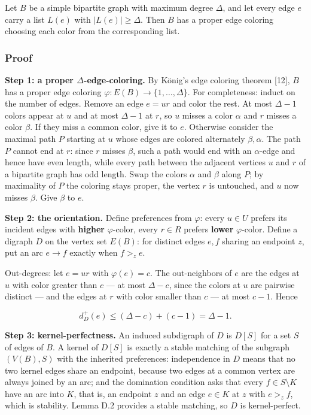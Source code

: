 \documentclass[
  11pt,
]{article}
\begin{document}
Let \(B\) be a simple bipartite graph with maximum degree \(\Delta\), and let every edge \(e\) carry a list \(L(e)\) with \(|L(e)|\ge\Delta\). Then \(B\) has a proper edge coloring choosing each color from the corresponding list.

\subsubsection{Proof}\label{proof-9}

\textbf{Step 1: a proper \(\Delta\)-edge-coloring.} By König's edge coloring theorem {[}12{]}, \(B\) has a proper edge coloring \(\varphi:E(B)\to\{1,\ldots,\Delta\}\). For completeness: induct on the number of edges. Remove an edge \(e=ur\) and color the rest. At most \(\Delta-1\) colors appear at \(u\) and at most \(\Delta-1\) at \(r\), so \(u\) misses a color \(\alpha\) and \(r\) misses a color \(\beta\). If they miss a common color, give it to \(e\). Otherwise consider the maximal path \(P\) starting at \(u\) whose edges are colored alternately \(\beta,\alpha\). The path \(P\) cannot end at \(r\): since \(r\) misses \(\beta\), such a path would end with an \(\alpha\)-edge and hence have even length, while every path between the adjacent vertices \(u\) and \(r\) of a bipartite graph has odd length. Swap the colors \(\alpha\) and \(\beta\) along \(P\); by maximality of \(P\) the coloring stays proper, the vertex \(r\) is untouched, and \(u\) now misses \(\beta\). Give \(\beta\) to \(e\).

\textbf{Step 2: the orientation.} Define preferences from \(\varphi\): every \(u\in U\) prefers its incident edges with \textbf{higher} \(\varphi\)-color, every \(r\in R\) prefers \textbf{lower} \(\varphi\)-color. Define a digraph \(D\) on the vertex set \(E(B)\): for distinct edges \(e,f\) sharing an endpoint \(z\), put an arc \(e\to f\) exactly when \(f>_ze\).

Out-degrees: let \(e=ur\) with \(\varphi(e)=c\). The out-neighbors of \(e\) are the edges at \(u\) with color greater than \(c\) --- at most \(\Delta-c\), since the colors at \(u\) are pairwise distinct --- and the edges at \(r\) with color smaller than \(c\) --- at most \(c-1\). Hence

\[
d^+_D(e)\le(\Delta-c)+(c-1)=\Delta-1.
\]

\textbf{Step 3: kernel-perfectness.} An induced subdigraph of \(D\) is \(D[S]\) for a set \(S\) of edges of \(B\). A kernel of \(D[S]\) is exactly a stable matching of the subgraph \((V(B),S)\) with the inherited preferences: independence in \(D\) means that no two kernel edges share an endpoint, because two edges at a common vertex are always joined by an arc; and the domination condition asks that every \(f\in S\setminus K\) have an arc into \(K\), that is, an endpoint \(z\) and an edge \(e\in K\) at \(z\) with \(e>_zf\), which is stability. Lemma D.2 provides a stable matching, so \(D\) is kernel-perfect.
\end{document}
